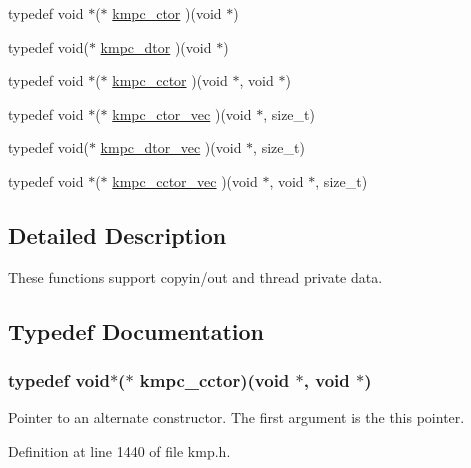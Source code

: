 \begin{DoxyCompactItemize}
\item 
typedef void $\ast$($\ast$ \hyperlink{group__THREADPRIVATE_ga0c2f8074a8474eee42bc96a4bdc7679a}{kmpc\-\_\-ctor} )(void $\ast$)
\item 
typedef void($\ast$ \hyperlink{group__THREADPRIVATE_gad8268ac7d007fa1c3351da682c487c0f}{kmpc\-\_\-dtor} )(void $\ast$)
\item 
typedef void $\ast$($\ast$ \hyperlink{group__THREADPRIVATE_gab6148c019e88c8853596bf5f516373b4}{kmpc\-\_\-cctor} )(void $\ast$, void $\ast$)
\item 
typedef void $\ast$($\ast$ \hyperlink{group__THREADPRIVATE_gac1f868aef7d531d34b91eaa57e339f21}{kmpc\-\_\-ctor\-\_\-vec} )(void $\ast$, size\-\_\-t)
\item 
typedef void($\ast$ \hyperlink{group__THREADPRIVATE_gab7035b42d465074b31195534efb37e3b}{kmpc\-\_\-dtor\-\_\-vec} )(void $\ast$, size\-\_\-t)
\item 
typedef void $\ast$($\ast$ \hyperlink{group__THREADPRIVATE_gaf9503cacabf6cf90ed34f2727fc480bc}{kmpc\-\_\-cctor\-\_\-vec} )(void $\ast$, void $\ast$, size\-\_\-t)
\end{DoxyCompactItemize}


\subsection{Detailed Description}
These functions support copyin/out and thread private data. 

\subsection{Typedef Documentation}
\hypertarget{group__THREADPRIVATE_gab6148c019e88c8853596bf5f516373b4}{
\subsubsection[{kmpc\-\_\-cctor}]{\setlength{\rightskip}{0pt plus 5cm}typedef void$\ast$($\ast$ kmpc\-\_\-cctor)(void $\ast$, void $\ast$)}}\label{group__THREADPRIVATE_gab6148c019e88c8853596bf5f516373b4}
Pointer to an alternate constructor. The first argument is the {\ttfamily this} pointer. 

Definition at line 1440 of file kmp.\-h.

